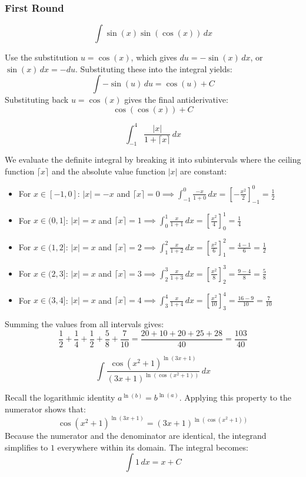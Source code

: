 \subsubsection*{First Round}
\begin{questions}
    \question \[ \int \sin(x) \sin(\cos(x)) \,dx \]
    \begin{solution}
        Use the substitution $u = \cos(x)$, which gives $du = -\sin(x) \,dx$, or $\sin(x) \,dx = -du$. Substituting these into the integral yields:
        \[ \int -\sin(u) \,du = \cos(u) + C \]
        Substituting back $u = \cos(x)$ gives the final antiderivative:
        \[ \cos(\cos(x)) + C \]
    \end{solution}

    \question \[ \int_{-1}^{4} \frac{|x|}{1 + \lceil x \rceil} \,dx \]
    \begin{solution}
        We evaluate the definite integral by breaking it into subintervals where the ceiling function $\lceil x \rceil$ and the absolute value function $|x|$ are constant:
        \begin{itemize}
            \item For $x \in [-1, 0]$: $|x| = -x$ and $\lceil x \rceil = 0 \implies \int_{-1}^{0} \frac{-x}{1+0} \,dx = \left[ -\frac{x^2}{2} \right]_{-1}^{0} = \frac{1}{2}$
            \item For $x \in (0, 1]$: $|x| = x$ and $\lceil x \rceil = 1 \implies \int_{0}^{1} \frac{x}{1+1} \,dx = \left[ \frac{x^2}{4} \right]_{0}^{1} = \frac{1}{4}$
            \item For $x \in (1, 2]$: $|x| = x$ and $\lceil x \rceil = 2 \implies \int_{1}^{2} \frac{x}{1+2} \,dx = \left[ \frac{x^2}{6} \right]_{1}^{2} = \frac{4-1}{6} = \frac{1}{2}$
            \item For $x \in (2, 3]$: $|x| = x$ and $\lceil x \rceil = 3 \implies \int_{2}^{3} \frac{x}{1+3} \,dx = \left[ \frac{x^2}{8} \right]_{2}^{3} = \frac{9-4}{8} = \frac{5}{8}$
            \item For $x \in (3, 4]$: $|x| = x$ and $\lceil x \rceil = 4 \implies \int_{3}^{4} \frac{x}{1+4} \,dx = \left[ \frac{x^2}{10} \right]_{3}^{4} = \frac{16-9}{10} = \frac{7}{10}$
        \end{itemize}
        Summing the values from all intervals gives:
        \[ \frac{1}{2} + \frac{1}{4} + \frac{1}{2} + \frac{5}{8} + \frac{7}{10} = \frac{20 + 10 + 20 + 25 + 28}{40} = \frac{103}{40} \]
    \end{solution}

    \question \[ \int \frac{\cos(x^2 + 1)^{\ln(3x+1)}}{(3x+1)^{\ln(\cos(x^2 + 1))}} \,dx \]
    \begin{solution}
        Recall the logarithmic identity $a^{\ln(b)} = b^{\ln(a)}$. Applying this property to the numerator shows that:
        \[ \cos(x^2 + 1)^{\ln(3x+1)} = (3x+1)^{\ln(\cos(x^2 + 1))} \]
        Because the numerator and the denominator are identical, the integrand simplifies to $1$ everywhere within its domain. The integral becomes:
        \[ \int 1 \,dx = x + C \]
    \end{solution}


\end{questions}
